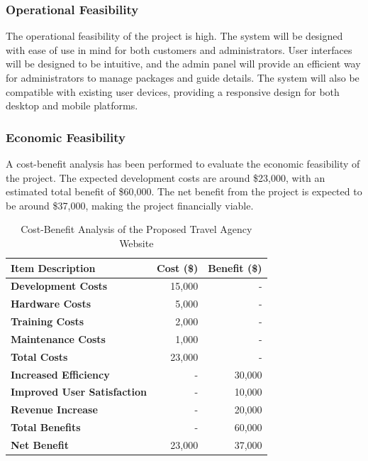\subsubsection{Operational Feasibility}
The operational feasibility of the project is high. The system will be designed with ease of use in mind for both customers and administrators. User interfaces will be designed to be intuitive, and the admin panel will provide an efficient way for administrators to manage packages and guide details. The system will also be compatible with existing user devices, providing a responsive design for both desktop and mobile platforms.

\subsubsection{Economic Feasibility}
A cost-benefit analysis has been performed to evaluate the economic feasibility of the project. The expected development costs are around \$23,000, with an estimated total benefit of \$60,000. The net benefit from the project is expected to be around \$37,000, making the project financially viable.

\begin{table}[ht]
    \caption{Cost-Benefit Analysis of the Proposed Travel Agency Website}
    \vspace{0.2in}
    \label{tab:cost_benefit_analysis}
    \centering
    \begin{tabular}{|l|r|r|}
        \hline
        \textbf{Item Description} & \textbf{Cost (\$)} & \textbf{Benefit (\$)} \\
        \hline
        \textbf{Development Costs} & 15,000 & - \\
        \hline
        \textbf{Hardware Costs} & 5,000 & - \\
        \hline
        \textbf{Training Costs} & 2,000 & - \\
        \hline
        \textbf{Maintenance Costs} & 1,000 & - \\
        \hline
        \textbf{Total Costs} & 23,000 & - \\
        \hline
        \textbf{Increased Efficiency} & - & 30,000 \\
        \hline
        \textbf{Improved User Satisfaction} & - & 10,000 \\
        \hline
        \textbf{Revenue Increase} & - & 20,000 \\
        \hline
        \textbf{Total Benefits} & - & 60,000 \\
        \hline
        \textbf{Net Benefit} & 23,000 & 37,000 \\
        \hline
    \end{tabular}
\end{table}

